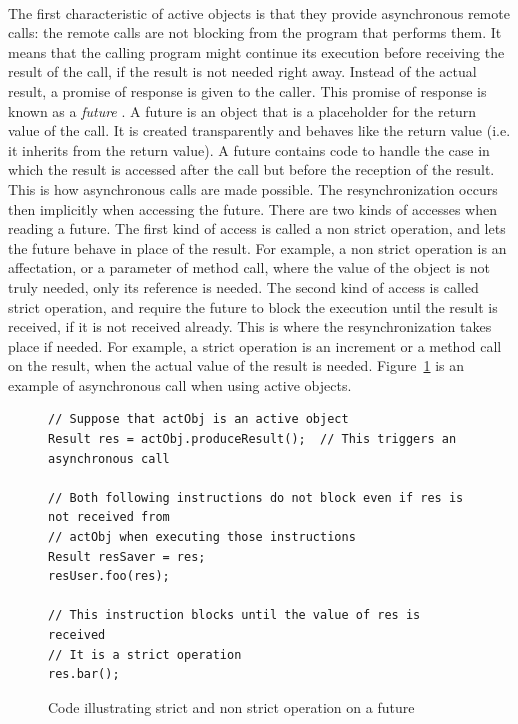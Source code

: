 \documentclass[11pt]{report}
\begin{document}
\paragraph{}
The first characteristic of active objects is that they provide asynchronous remote calls: the remote calls are not blocking from the program that performs them. It means that the calling program might continue its execution before receiving the result of the call, if the result is not needed right away. Instead of the actual result, a promise of response is given to the caller. This promise of response is known as a \emph{future} \cite{ref:Halstead:1985:MLC:4472.4478}. A future is an object that is a placeholder for the return value of the call. It is created transparently and behaves like the return value (i.e. it inherits from the return value). A future contains code to handle the case in which the result is accessed after the call but before the reception of the result. This is how asynchronous calls are made possible.
The resynchronization occurs then implicitly when accessing the future. There are two kinds of accesses when reading a future. The first kind of access is called a non strict operation, and lets the future behave in place of the result. For example, a non strict operation is an affectation, or a parameter of method call, where the value of the object is not truly needed, only its reference is needed. The second kind of access is called strict operation, and require the future to block the execution until the result is received, if it is not received already. This is where the resynchronization takes place if needed. For example, a strict operation is an increment or a method call on the result, when the actual value of the result is needed.
Figure~\ref{fig:strict_operation} is an example of asynchronous call when using active objects.

\begin{figure}[!ht]
	\lstset{language=java, numbers=left, numberstyle=\tiny, stepnumber=1, numbersep=5pt, basicstyle=\footnotesize}
	\begin{lstlisting}[frame=single]
// Suppose that actObj is an active object
Result res = actObj.produceResult();  // This triggers an asynchronous call

// Both following instructions do not block even if res is not received from 
// actObj when executing those instructions
Result resSaver = res;
resUser.foo(res);

// This instruction blocks until the value of res is received 
// It is a strict operation
res.bar();
 	\end{lstlisting}
\caption{Code illustrating strict and non strict operation on a future}
\label{fig:strict_operation}
\end{figure}
\end{document}

